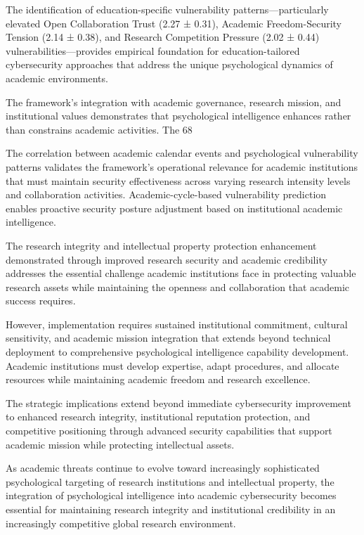 \documentclass[10pt, twocolumn]{article}
\begin{document}
The identification of education-specific vulnerability patterns—particularly elevated Open Collaboration Trust (2.27 ± 0.31), Academic Freedom-Security Tension (2.14 ± 0.38), and Research Competition Pressure (2.02 ± 0.44) vulnerabilities—provides empirical foundation for education-tailored cybersecurity approaches that address the unique psychological dynamics of academic environments.

The framework's integration with academic governance, research mission, and institutional values demonstrates that psychological intelligence enhances rather than constrains academic activities. The 68%

The correlation between academic calendar events and psychological vulnerability patterns validates the framework's operational relevance for academic institutions that must maintain security effectiveness across varying research intensity levels and collaboration activities. Academic-cycle-based vulnerability prediction enables proactive security posture adjustment based on institutional academic intelligence.

The research integrity and intellectual property protection enhancement demonstrated through improved research security and academic credibility addresses the essential challenge academic institutions face in protecting valuable research assets while maintaining the openness and collaboration that academic success requires.

However, implementation requires sustained institutional commitment, cultural sensitivity, and academic mission integration that extends beyond technical deployment to comprehensive psychological intelligence capability development. Academic institutions must develop expertise, adapt procedures, and allocate resources while maintaining academic freedom and research excellence.

The strategic implications extend beyond immediate cybersecurity improvement to enhanced research integrity, institutional reputation protection, and competitive positioning through advanced security capabilities that support academic mission while protecting intellectual assets.

As academic threats continue to evolve toward increasingly sophisticated psychological targeting of research institutions and intellectual property, the integration of psychological intelligence into academic cybersecurity becomes essential for maintaining research integrity and institutional credibility in an increasingly competitive global research environment.
\end{document}
